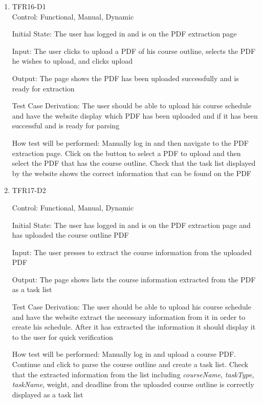 \documentclass[12pt, titlepage]{article}
\begin{document}
  \begin{enumerate}
  
  \item{TFR16-D1\\}
  Control: Functional, Manual, Dynamic
            
  Initial State: The user has logged in and is on the PDF extraction page
            
  Input: The user clicks to upload a PDF of his course outline, selects the PDF he wishes to upload, and clicks upload
            
  Output: The page shows the PDF has been uploaded successfully and is ready for extraction
  
  Test Case Derivation: The user should be able to upload his course schedule and have the website display which PDF has been uploaded and if it has been successful and is ready for parsing
            
  How test will be performed: Manually log in and then navigate to the PDF extraction page. Click on the button to select a PDF to upload and then select the PDF that has the course outline. Check that the task list displayed by the website shows the correct information that can be found on the PDF
  
  \item{TFR17-D2\\}
  
  Control: Functional, Manual, Dynamic
            
  Initial State: The user has logged in and is on the PDF extraction page and has uploaded the course outline PDF
            
  Input: The user presses to extract the course information from the uploaded PDF
            
  Output: The page shows lists the course information extracted from the PDF as a task list
  
  Test Case Derivation: The user should be able to upload his course schedule and have the website extract the necessary information from it in order to create his schedule. After it has extracted the information it should display it to the user for quick verification
            
  How test will be performed: Manually log in and upload a course PDF. Continue and click to parse the course outline and create a task list. Check that the extracted information from the list including \textit{courseName}, \textit{taskType}, \textit{taskName}, weight, and deadline from the uploaded course outline is correctly displayed as a task list


\end{enumerate}
\end{document}
